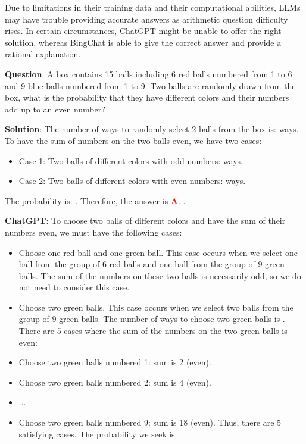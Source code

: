 \documentclass{article}
\begin{document}
{	Due to limitations in their training data and their computational abilities, LLMs may have trouble providing accurate answers as arithmetic question difficulty rises. In certain circumstances, ChatGPT might be unable to offer the right solution, whereas BingChat is able to give the correct answer and provide a rational explanation.
	
	
	
	\begin{mdframed}[linewidth=1pt,linecolor=red]
		\textbf{Question}: A box contains 15 balls including 6 red balls numbered from 1 to 6 and 9 blue balls numbered from 1 to 9. Two balls are randomly drawn from the box, what is the probability that they have different colors and their numbers add up to an even number?
		
		\begin{oneparchoices}
			\choice 
			\choice 
			\choice 
			\choice 
		\end{oneparchoices}
		
		\textbf{Solution}:
		The number of ways to randomly select 2 balls from the box is:  ways.
		To have the sum of numbers on the two balls even, we have two cases:
		\begin{itemize}
			\item Case 1: Two balls of different colors with odd numbers:  ways.
			\item Case 2: Two balls of different colors with even numbers:  ways.
		\end{itemize}
		The probability is: .
		Therefore, the answer is \textcolor{red}{\textbf{A}}. .
		
		\textbf{ChatGPT}: To choose two balls of different colors and have the sum of their numbers even, we must have the following cases:
		\begin{itemize}
			\item Choose one red ball and one green ball. This case occurs when we select one ball from the group of 6 red balls and one ball from the group of 9 green balls. The sum of the numbers on these two balls is necessarily odd, so we do not need to consider this case.
			\item Choose two green balls. This case occurs when we select two balls from the group of 9 green balls. The number of ways to choose two green balls is . There are 5 cases where the sum of the numbers on the two green balls is even:
			\item Choose two green balls numbered 1: sum is 2 (even).
			\item Choose two green balls numbered 2: sum is 4 (even).
			\item ...
			\item Choose two green balls numbered 9: sum is 18 (even). Thus, there are 5 satisfying cases. The probability we seek is:
		\end{itemize}
		 

\end{mdframed}}
\end{document}

